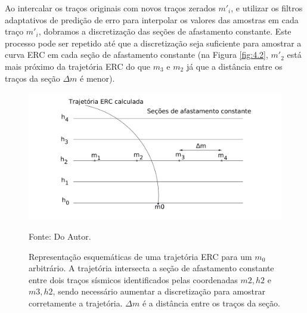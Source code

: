 Ao intercalar os traços originais com novos traços zerados $m'_i$, e utilizar os filtros adaptativos de predição
de erro para interpolar os valores das amostras em cada traço $m'_i$, dobramos 
a discretização das seções de afastamento constante.
Este processo pode ser repetido até que a discretização seja suficiente para amostrar a curva ERC em cada seção de afastamento
constante (na Figura \ref{fig:4.2}, $m'_2$ está mais próximo da trajetória 
ERC do que $m_3$ e $m_2$ já que a distância 
entre os traços da seção $\Delta m$ é menor).

\begin{figure}
\caption{Representação esquemáticas de uma trajetória ERC para um $m_0$ arbitrário. A trajetória intersecta a seção de
afastamento constante entre dois traços sísmicos identificados pelas coordenadas $m2, h2$ e $m3, h2$, sendo necessário
aumentar a discretização para amostrar corretamente a trajetória. $\Delta m$ é a distância entre os traços da seção.}
\begin{center}
\includegraphics[scale=0.15]{images/interpolacao0.png}
\vspace{-0.3cm}
\end{center}
\begin{center}
 Fonte: Do Autor.
\end{center}
\label{fig:4.1}
\end{figure}


